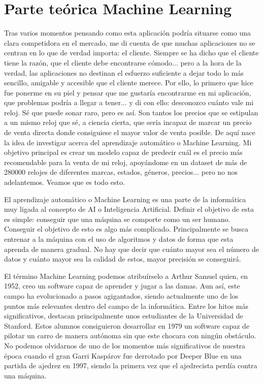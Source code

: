 \section{Parte teórica Machine Learning}

	Tras varios momentos pensando como esta aplicación podría situarse como una clara competidora en el mercado, me di cuenta de que muchas aplicaciones no se centran en lo que de verdad importa: el cliente. Siempre se ha dicho que el cliente tiene la razón, que el cliente debe encontrarse cómodo... pero a la hora de la verdad, las aplicaciones no destinan el esfuerzo suficiente a dejar todo lo más sencillo, amigable y accesible que el cliente merece. Por ello, lo primero que hice fue ponerme en su piel y pensar que me gustaría encontrarme en mi aplicación, que problemas podría a llegar a tener... y di con ello: desconozco cuánto vale mi reloj. Sé que puede sonar raro, pero es así. Son tantos los precios que se estipulan a un mismo reloj que sé, a ciencia cierta, que sería incapaz de marcar un precio de venta directa donde consiguiese el mayor valor de venta posible. De aquí nace la idea de investigar acerca del aprendizaje automático o Machine Learning. Mi objetivo principal es crear un modelo capaz de predecir cuál es el precio más recomendable para la venta de mi reloj, apoyándome en un dataset de más de 280000 relojes de diferentes marcas, estados, géneros, precios... pero no nos adelantemos. Veamos que es todo esto.
	
	El aprendizaje automático o Machine Learning es una parte de la informática muy ligada al concepto de AI o Inteligencia Artificial. Definir el objetivo de esta es simple: conseguir que una máquina se comporte como un ser humano. Conseguir el objetivo de esto es algo más complicado. Principalmente se busca entrenar a la máquina con el uso de algoritmos y datos de forma que esta aprenda de manera gradual. No hay que decir que cuánto mayor sea el número de datos y cuánto mayor sea la calidad de estos, mayor precisión se conseguirá. 
	
	El término Machine Learning podemos atribuírselo a Arthur Samuel quien, en 1952, creo un software capaz de aprender y jugar a las damas. Aun así, este campo ha evolucionado a pasos agigantados, siendo actualmente uno de los puntos más relevantes dentro del campo de la informática. Entre los hitos más significativos, destacan principalmente unos estudiantes de la Universidad de Stanford. Estos alumnos consiguieron desarrollar en 1979 un software capaz de pilotar un carro de manera autónoma sin que este chocara con ningún obstáculo.  No podemos olvidarnos de uno de los momentos más significativos de nuestra época cuando el gran Garri Kaspárov fue derrotado por Deeper Blue en una partida de ajedrez en 1997, siendo la primera vez que el ajedrecista perdía contra una máquina.
	
